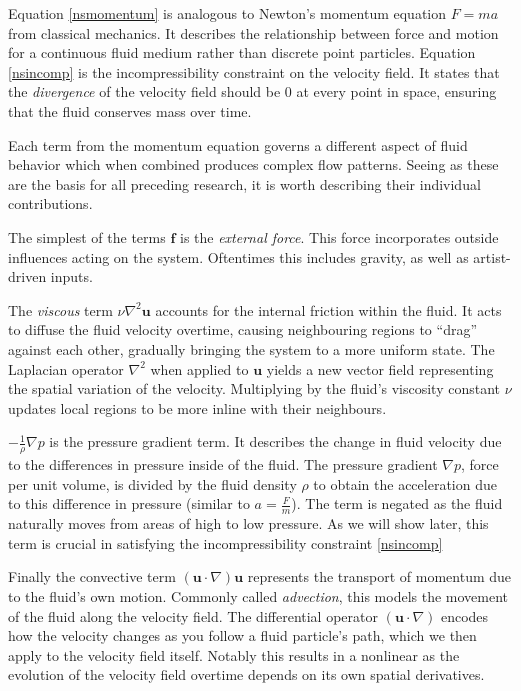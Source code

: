 \documentclass[a4paper, 11pt, titlepage]{article}
\renewcommand\i[1]{\textit{#1}}%
\begin{document}
Equation \eqref{nsmomentum} is analogous to Newton's momentum
equation $F = ma$ from classical mechanics. It describes the relationship between force and motion for a
continuous fluid medium rather than discrete point particles. Equation
\eqref{nsincomp} is the incompressibility constraint on the velocity field. It states that the \i{divergence} of the velocity field should
be 0 at every point in space, ensuring that the fluid conserves mass over time.

Each term from the momentum equation governs a different aspect of fluid
behavior which when combined produces complex flow patterns. Seeing as these
are the basis for all preceding research, it is worth describing
their individual contributions.

The simplest of the terms $\bm{f}$ is the \i{external force}. This force
incorporates outside influences acting on the system. Oftentimes this includes
gravity, as well as artist-driven inputs.

The \i{viscous} term $\nu \nabla^2\bm{u}$ accounts for the internal friction
within the fluid. It acts to diffuse the fluid velocity overtime, causing
neighbouring regions to ``drag'' against each other, gradually bringing the
system to a more uniform state. The Laplacian operator $\nabla^2$ when applied
to $\bm{u}$ yields a new vector field representing the spatial variation of the
velocity. Multiplying by the fluid's viscosity constant $\nu$ updates
local regions to be more inline with their neighbours.

$-\frac{1}{\rho}\nabla p$ is the pressure gradient term. It
describes the change in fluid velocity due to the differences in pressure inside
of the fluid. The pressure gradient $\nabla p$, force per unit volume, is
divided by the fluid density $\rho$ to obtain the acceleration due to this
difference in pressure (similar to $a = \frac{F}{m}$). The term is negated as
the fluid naturally moves from areas of high to low pressure. As we will show
later, this term is crucial in satisfying the incompressibility constraint
\eqref{nsincomp}

Finally the convective term $(\bm{u} \cdot \nabla)\bm{u}$ represents the
transport of momentum due to the fluid's own motion. Commonly called
\i{advection}, this models the movement of the fluid along the velocity field. The differential operator $(\bm{u} \cdot
\nabla)$ encodes how the velocity changes as you follow a fluid particle's path,
which we then apply to the velocity field itself.
Notably this results in a nonlinear as the evolution of the velocity field overtime
depends on its own spatial derivatives.
\end{document}
